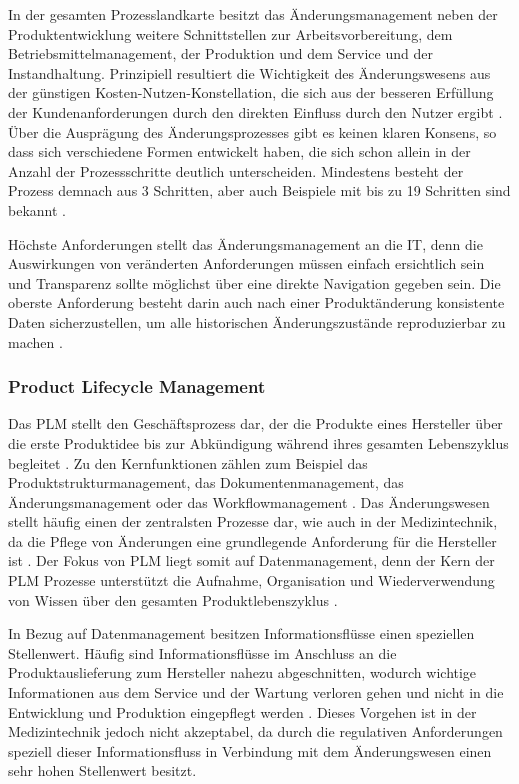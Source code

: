 \documentclass[a4paper,12pt]{report}
\begin{document}
In der gesamten Prozesslandkarte besitzt das Änderungsmanagement neben der Produktentwicklung weitere Schnittstellen zur Arbeitsvorbereitung, dem Betriebsmittelmanagement, der Produktion und dem Service und der Instandhaltung. Prinzipiell resultiert die Wichtigkeit des Änderungswesens aus der günstigen Kosten-Nutzen-Konstellation, die sich aus der besseren Erfüllung der Kundenanforderungen durch den direkten Einfluss durch den Nutzer ergibt \citep[vgl.][]{Wu2014}.  Über die Ausprägung des Änderungsprozesses gibt es keinen klaren Konsens, so dass sich verschiedene Formen entwickelt haben, die sich schon allein in der Anzahl der Prozessschritte deutlich unterscheiden. Mindestens besteht der Prozess demnach aus 3 Schritten, aber auch Beispiele mit bis zu 19 Schritten sind bekannt \citep[vgl.][S. 155]{Stark2015}.

Höchste Anforderungen stellt das Änderungsmanagement an die IT, denn die Auswirkungen von veränderten Anforderungen müssen einfach ersichtlich sein und Transparenz sollte möglichst über eine direkte Navigation gegeben sein. Die oberste Anforderung besteht darin auch nach einer Produktänderung konsistente Daten sicherzustellen, um alle historischen Änderungszustände reproduzierbar zu machen \citep[vgl.][S. 85]{Scheer2006}.


\subsubsection{Product Lifecycle Management}
Das \ac{PLM} stellt den Geschäftsprozess dar, der die Produkte eines Hersteller über die erste Produktidee bis zur Abkündigung während ihres gesamten Lebenszyklus begleitet \citep[vgl.][S. 203]{Kale2016}. Zu den Kernfunktionen zählen zum Beispiel das Produktstrukturmanagement, das Dokumentenmanagement, das Änderungsmanagement oder das Workflowmanagement \citep[vgl.][S. 44]{Saaksvuori2008}. Das Änderungswesen stellt häufig einen der zentralsten Prozesse dar, wie auch in der Medizintechnik, da die Pflege von Änderungen eine grundlegende Anforderung für die Hersteller ist \citep[vgl.][S. 175]{Arnold2011}. Der Fokus von \ac{PLM} liegt somit auf Datenmanagement, denn der Kern der PLM Prozesse unterstützt die Aufnahme, Organisation und Wiederverwendung von Wissen über den gesamten Produktlebenszyklus \citep[vgl.][S. 46]{Tayaran2012}.

In Bezug auf Datenmanagement besitzen Informationsflüsse einen speziellen Stellenwert. Häufig sind Informationsflüsse im Anschluss an die Produktauslieferung zum Hersteller nahezu abgeschnitten, wodurch wichtige Informationen aus dem Service und der Wartung verloren gehen und nicht in die Entwicklung und Produktion eingepflegt werden \citep[vgl.][S. 16f.]{Jun2012}. Dieses Vorgehen ist in der Medizintechnik jedoch nicht akzeptabel, da durch die regulativen Anforderungen speziell dieser Informationsfluss in Verbindung mit dem Änderungswesen einen sehr hohen Stellenwert besitzt.
\end{document}
